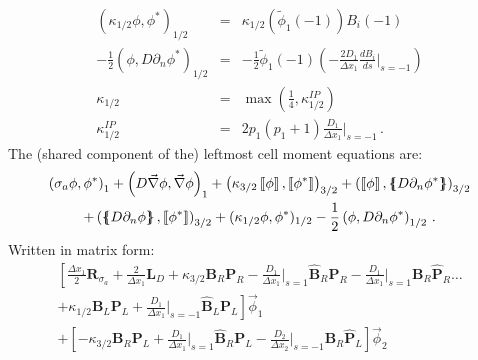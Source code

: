 \documentclass[11pt]{article}
\newcommand{\beanum}{\begin{eqnarray}}
\newcommand{\eeanum}{\end{eqnarray}}
\newcommand{\del}{\ensuremath{ \vec{\nabla} }}
\newcommand{\B}[1]{\ensuremath{{B_{#1} }}}
\newcommand{\p}{\ensuremath{ d}}
\newcommand{\jmp}[1]{\ensuremath{\left\llbracket #1 \right\rrbracket}}
\newcommand{\avg}[1]{\ensuremath{ \left \{ \hspace{-0.055in} \left \{ #1  \right \}\hspace{-0.055in} \right \} }}
\newcommand{\pep}{\, .}
\begin{document}
\beanum
\left( \kappa_{1/2} \phi, \phi^*\right)_{1/2} &=& \kappa_{1/2}\left(\widetilde{\phi}_1(-1) \right) \B{i}(-1) \\
-\frac{1}{2}\left( \phi, D\partial_n \phi^* \right)_{1/2} &=& -  \frac{1}{2}\widetilde{\phi}_1(-1) \left(-\frac{2 D_1}{\Delta x_1} \frac{\p \B{i}}{\p s} \bigg \lvert_{s=-1} \right)\\
\kappa_{1/2} &=& \max \left( \frac{1}{4},\kappa_{1/2}^{IP} \right) \\
\kappa_{1/2}^{IP} &=& 2 p_1 (p_1 + 1)\frac{D_1}{\Delta x_1}\bigg \lvert_{s=-1} \pep
\eeanum
The (shared component of the) leftmost cell moment equations are:
\begin{multline*}
\left( \sigma_a\phi,\phi^* \right)_1 + \left( D\del\phi,\del\phi \right)_1
  +\left( \kappa_{3/2} \jmp{\phi},\jmp{\phi^*}\right)_{3/2} 
 +\left(  \jmp{\phi}, \avg{ D\partial_n \phi^*}\right)_{3/2} \\
 +\left( \avg{D\partial_n\phi}, \jmp{\phi^*} \right)_{3/2} 
 + (\kappa_{1/2} \phi, \phi^*)_{1/2} - \frac{1}{2}\left( \phi,D\partial_n \phi^*  \right)_{1/2}   \pep
\end{multline*}
%
%
Written in matrix form:
\begin{multline}
\left[ \frac{\Delta x_1}{2} \mathbf{R}_{\sigma_a} + \frac{2}{\Delta x_1}\mathbf{L}_D + \kappa_{3/2} \mathbf{B}_R \mathbf{P}_R - \frac{D_1}{\Delta x_1}\bigg \lvert_{s=1}\widehat{\mathbf B}_R \mathbf{P}_R - \frac{D_1}{\Delta x_1}\bigg \vert_{s=1} \mathbf{B}_R \widehat{\mathbf P}_R \right. \dots \\
\left. + \kappa_{1/2} \mathbf{B}_L \mathbf{P}_L + \frac{D_1}{\Delta x_1} \bigg \lvert_{s=-1} \widehat{\mathbf B}_L \mathbf{P}_L \right]\vec{\phi}_1 \\
%
+ \left[ -\kappa_{3/2}\mathbf{B}_R\mathbf{P}_L + \frac{D_1}{\Delta x_1}\bigg \lvert_{s=1}\widehat{\mathbf B}_R \mathbf{P}_L -\frac{D_2}{\Delta x_2}\bigg \vert_{s=-1} \mathbf{B}_R \widehat{\mathbf P}_L\right] \vec{\phi}_2
\end{multline}
\end{document}
